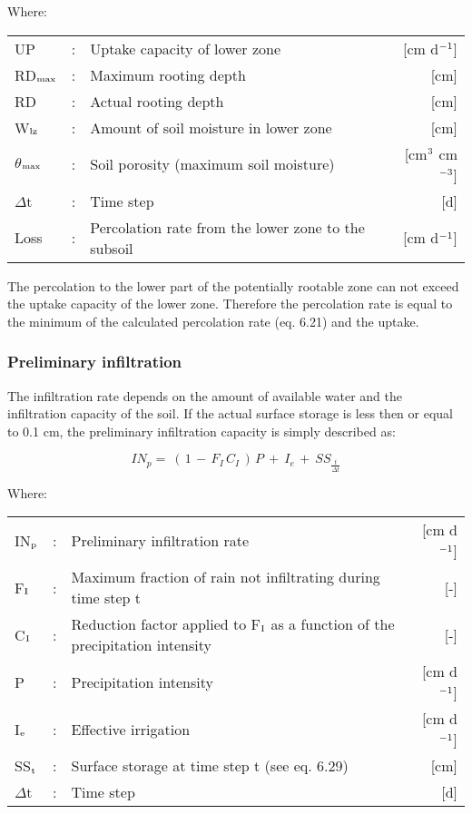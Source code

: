 Where:\\
\begin{tabularx}{\textwidth}{llXr}
UP &:& Uptake capacity of lower zone  & [cm d$^{{\rm -1}}$]\\
RD$_{{\rm max}}$ &:& Maximum rooting depth  & [cm]\\
RD &:& Actual rooting depth  & [cm]\\
W$_{{\rm lz}}$ &:& Amount of soil moisture in lower zone  & [cm]\\
$\theta$$_{{\rm max}}$ &:& Soil porosity (maximum soil moisture)  & [cm$^{{\rm 3}}$ cm$^{{\rm -3}}$]\\
$\Delta$t &:& Time step  & [d]\\
Loss &:& Percolation rate from the lower zone to the subsoil   & [cm d$^{{\rm -1}}$]\\
\end{tabularx}

The percolation to the lower part of the potentially rootable zone can not exceed the
uptake capacity of the lower zone. Therefore the percolation rate is equal to the minimum
of the calculated percolation rate (eq. 6.21) and the uptake.

\subsubsection{Preliminary infiltration}
The infiltration rate depends on the amount of available water and the infiltration capacity
of the soil. If the actual surface storage is less then or equal to 0.1 cm, the preliminary
infiltration capacity is simply described as:

\begin{equation}
IN_{p} =~ (\, 1\, -\, F _{I} \, C _{I} \, )\, P~+~ I _{e~} +~ SS _{\frac{t}{ \Delta t}} 
\end{equation}

Where:\\
\begin{tabularx}{\textwidth}{llXr}
IN$_{{\rm p}}$ &:& Preliminary infiltration rate  & [cm d$^{{\rm -1}}$]\\
F$_{{\rm I}}$ &:& Maximum fraction of rain not infiltrating during time step t  & [-]\\
C$_{{\rm I}}$ &:& Reduction factor applied to F$_{{\rm I}}$ as a function of the 
   precipitation intensity  & [-]\\
P &:& Precipitation intensity  & [cm d$^{{\rm -1}}$]\\
I$_{{\rm e}}$ &:& Effective irrigation  & [cm d$^{{\rm -1}}$]\\
SS$_{{\rm t}}$ &:& Surface storage at time step t (see eq. 6.29)  & [cm]\\
$\Delta$t &:& Time step  & [d]\\
\end{tabularx}

